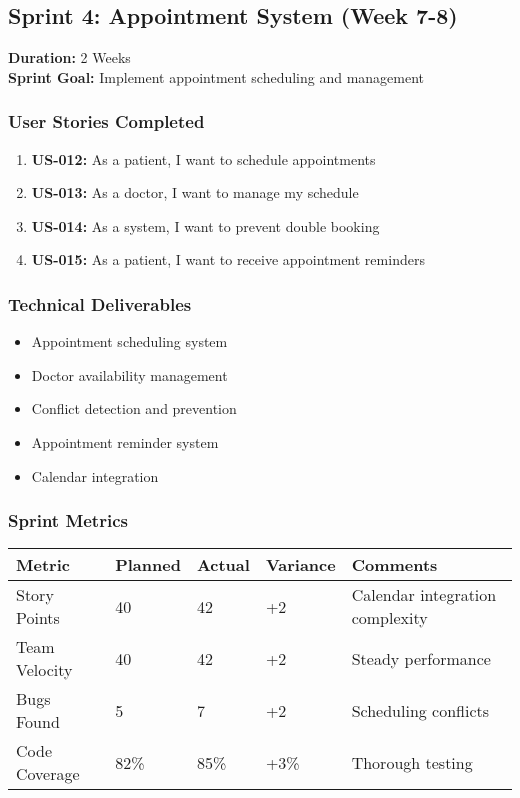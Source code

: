 \documentclass[12pt,a4paper]{article}
\begin{document}
\subsection{Sprint 4: Appointment System (Week 7-8)}
\textbf{Duration:} 2 Weeks \\
\textbf{Sprint Goal:} Implement appointment scheduling and management

\subsubsection{User Stories Completed}
\begin{enumerate}
    \item \textbf{US-012:} As a patient, I want to schedule appointments
    \item \textbf{US-013:} As a doctor, I want to manage my schedule
    \item \textbf{US-014:} As a system, I want to prevent double booking
    \item \textbf{US-015:} As a patient, I want to receive appointment reminders
\end{enumerate}

\subsubsection{Technical Deliverables}
\begin{itemize}
    \item Appointment scheduling system
    \item Doctor availability management
    \item Conflict detection and prevention
    \item Appointment reminder system
    \item Calendar integration
\end{itemize}

\subsubsection{Sprint Metrics}
\begin{longtable}{|p{4cm}|p{2cm}|p{2cm}|p{2cm}|p{4cm}|}
\hline
\textbf{Metric} & \textbf{Planned} & \textbf{Actual} & \textbf{Variance} & \textbf{Comments} \\
\hline
Story Points & 40 & 42 & +2 & Calendar integration complexity \\
\hline
Team Velocity & 40 & 42 & +2 & Steady performance \\
\hline
Bugs Found & 5 & 7 & +2 & Scheduling conflicts \\
\hline
Code Coverage & 82\% & 85\% & +3\% & Thorough testing \\
\hline
\end{longtable}
\end{document}
